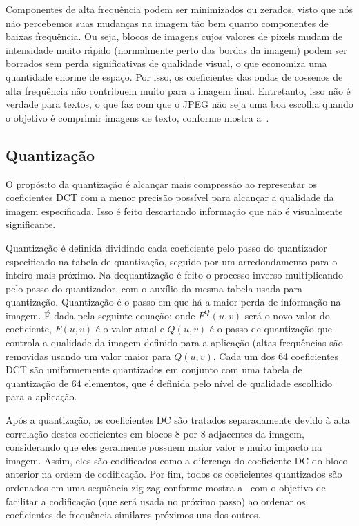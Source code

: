 
Componentes de alta frequência podem ser minimizados ou zerados, visto que nós não percebemos suas mudanças na imagem tão bem quanto componentes de baixas frequência. Ou seja, blocos de imagens cujos valores de pixels mudam de intensidade muito rápido (normalmente perto das bordas da imagem) podem ser borrados sem perda significativas de qualidade visual, o que economiza uma quantidade enorme de espaço. Por isso, os coeficientes das ondas de cossenos de alta frequência não contribuem muito para a imagem final. Entretanto, isso não é verdade para textos, o que faz com que o JPEG não seja uma boa escolha quando o objetivo é comprimir imagens de texto, conforme mostra a~.
\subsection{Quantização}
O propósito da quantização é alcançar mais compressão ao representar os coeficientes \acrshort{DCT} com a menor precisão possível para alcançar a qualidade da imagem especificada. Isso é feito descartando informação que não é visualmente significante.

Quantização é definida dividindo cada coeficiente pelo passo do quantizador especificado na tabela de quantização, seguido por um arredondamento para o inteiro mais próximo. Na dequantização é feito o processo inverso multiplicando pelo passo do quantizador, com o auxílio da mesma tabela usada para quantização. Quantização é o passo em que há a maior perda de informação na imagem. É dada pela seguinte equação:
onde $F^Q(u,v)$ será o novo valor do coeficiente, $F(u,v)$  é o valor atual e $Q(u,v)$ é o passo de quantização que controla a qualidade da imagem definido para a aplicação (altas frequências são removidas usando um valor maior para $Q(u,v)$. Cada um dos 64 coeficientes \acrshort{DCT} são uniformemente quantizados em conjunto com uma tabela de quantização de 64 elementos, que é definida pelo nível de qualidade escolhido para a aplicação.

Após a quantização, os coeficientes \acrshort{DC} são tratados separadamente devido à alta correlação destes coeficientes em blocos 8 por 8 adjacentes da imagem, considerando que eles geralmente possuem maior valor e muito impacto na imagem. Assim, eles são codificados como a diferença do coeficiente \acrshort{DC} do bloco anterior na ordem de codificação. Por fim, todos os coeficientes quantizados são ordenados em uma sequência zig-zag conforme mostra a~ com o objetivo de facilitar a codificação (que será usada no próximo passo) ao ordenar os coeficientes de frequência similares próximos uns dos outros.

